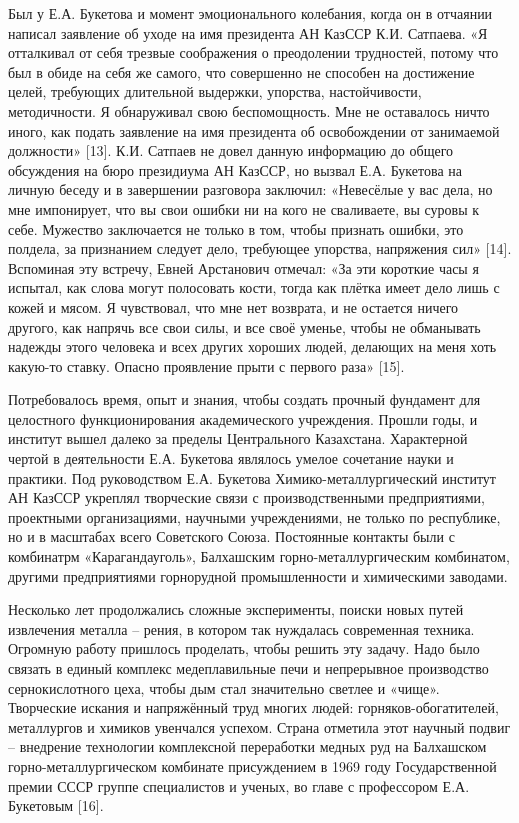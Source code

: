 \begin{multicols}{2}
Был у Е.А. Букетова и момент эмоционального колебания, когда он в
отчаянии написал заявление об уходе на имя президента АН КазССР К.И.
Сатпаева. «Я отталкивал от себя трезвые соображения о преодолении
трудностей, потому что был в обиде на себя же самого, что совершенно не
способен на достижение целей, требующих длительной выдержки, упорства,
настойчивости, методичности. Я обнаруживал свою беспомощность. Мне не
оставалось ничто иного, как подать заявление на имя президента об
освобождении от занимаемой должности» {[}13{]}. К.И. Сатпаев не довел
данную информацию до общего обсуждения на бюро президиума АН КазССР, но
вызвал Е.А. Букетова на личную беседу и в завершении разговора заключил:
«Невесёлые у вас дела, но мне импонирует, что вы свои ошибки ни на кого
не сваливаете, вы суровы к себе. Мужество заключается не только в том,
чтобы признать ошибки, это полдела, за признанием следует дело,
требующее упорства, напряжения сил» {[}14{]}. Вспоминая эту встречу,
Евней Арстанович отмечал: «За эти короткие часы я испытал, как слова
могут полосовать кости, тогда как плётка имеет дело лишь с кожей и
мясом. Я чувствовал, что мне нет возврата, и не остается ничего другого,
как напрячь все свои силы, и все своё уменье, чтобы не обманывать
надежды этого человека и всех других хороших людей, делающих на меня
хоть какую-то ставку. Опасно проявление прыти с первого раза» {[}15{]}.

Потребовалось время, опыт и знания, чтобы создать прочный фундамент для
целостного функционирования академического учреждения. Прошли годы, и
институт вышел далеко за пределы Центрального Казахстана. Характерной
чертой в деятельности Е.А. Букетова являлось умелое сочетание науки и
практики. Под руководством Е.А. Букетова Химико-металлургический
институт АН КазССР укреплял творческие связи с производственными
предприятиями, проектными организациями, научными учреждениями, не
только по республике, но и в масштабах всего Советского Союза.
Постоянные контакты были с комбинатрм «Карагандауголь», Балхашским
горно-металлургическим комбинатом, другими предприятиями горнорудной
промышленности и химическими заводами.

Несколько лет продолжались сложные эксперименты, поиски новых путей
извлечения металла -- рения, в котором так нуждалась современная
техника. Огромную работу пришлось проделать, чтобы решить эту задачу.
Надо было связать в единый комплекс медеплавильные печи и непрерывное
производство сернокислотного цеха, чтобы дым стал значительно светлее и
«чище». Творческие искания и напряжённый труд многих людей:
горняков-обогатителей, металлургов и химиков увенчался успехом. Страна
отметила этот научный подвиг -- внедрение технологии комплексной
переработки медных руд на Балхашском горно-металлургическом комбинате
присуждением в 1969 году Государственной премии СССР группе специалистов
и ученых, во главе с профессором Е.А. Букетовым {[}16{]}.


\end{multicols}
